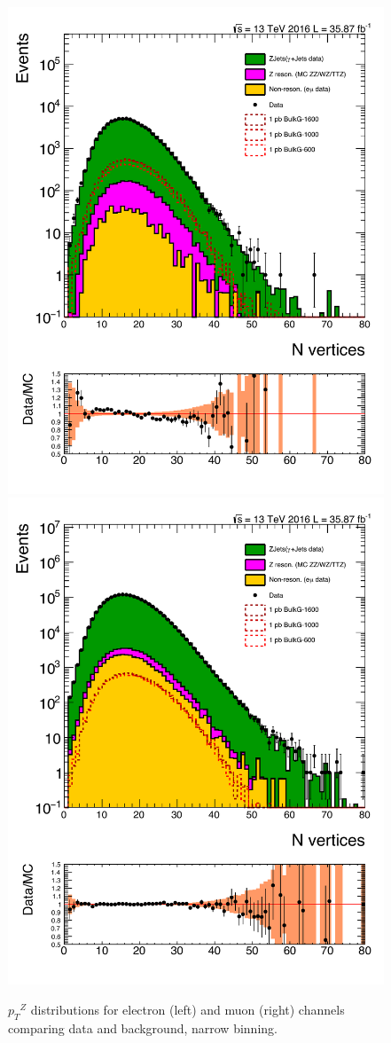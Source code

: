 \begin{figure}[htbp!]
\centering
\includegraphics[width=0.46\linewidth,page=10]{figures/ReMiniSummer16_DT_PhReMiniMCRcFixXsec_GMCPhPtWt_tightzpt50_puWeightsummer16_muoneg_gjet_metfilter_unblind_el_log_1pb.pdf}
\includegraphics[width=0.46\linewidth,page=10]{figures/ReMiniSummer16_DT_PhReMiniMCRcFixXsec_GMCPhPtWt_tightzpt50_puWeightsummer16_muoneg_gjet_metfilter_unblind_mu_log_1pb.pdf}
\caption{${p_T}^Z$ distributions for electron (left) and muon (right) channels
comparing data and background,
narrow binning.}
\label{fig:gjet_zpt_narrow}
\end{figure}

